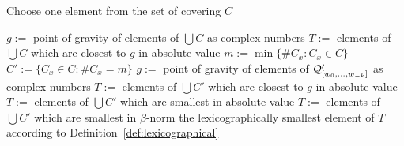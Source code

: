 \begin{algorithm}
   \caption{Choose one element from the set of covering $C$ }
   \label{alg:pickElement}   
  \begin{algorithmic}[1]
    	\STATE $g:=$ point of gravity of elements of $\bigcup C$ as complex numbers
    	\STATE $T:=$ elements of $\bigcup C$ which are closest to $g$ in absolute value
    \ELSE
    	\STATE $m:=\min\{\#C_x \colon C_x\in C \}$
    	\STATE $C':=\{C_x \in C \colon \#C_x=m\}$
    		\STATE $g:=$ point of gravity of elements of $\mathcal{Q}_{[w_{0}, \dots, w_{-k}]}'$ as complex numbers
    		\STATE $T:=$ elements of $\bigcup C'$ which are closest to $g$ in absolute value
			\STATE $T:=$ elements of $\bigcup C'$ which are smallest in absolute value
			\STATE $T:=$ elements of $\bigcup C'$ which are smallest in $\beta$-norm
    	\ENDIF
    \ENDIF    
    \RETURN the lexicographically smallest element of $T$ according to Definition~\ref{def:lexicographical}

  \end{algorithmic}
\end{algorithm}


